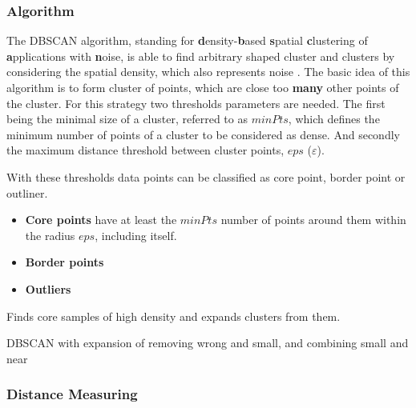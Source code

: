 \documentclass[a4paper,12pt]{report}
\begin{document}
\subsubsection{Algorithm}

The DBSCAN algorithm, standing for \textbf{d}ensity-\textbf{b}ased \textbf{s}patial \textbf{c}lustering of \textbf{a}pplications with \textbf{n}oise, is able to find arbitrary shaped cluster and clusters by considering the spatial density, which also represents noise  \cite{Yildirim2020,Chauhan2020}. The basic idea of this algorithm is to form cluster of points, which are close too \textbf{many} other points of the cluster. For this strategy two thresholds parameters are needed. The first being the minimal size of a cluster, referred to as $minPts$, which defines the minimum number of points of a cluster to be considered as dense. And secondly the maximum distance threshold between cluster points, $eps$ ($\varepsilon$). \cite{Yildirim2020,Chauhan2020} 

With these thresholds data points can be classified as core point, border point or outliner.

\begin{itemize}
	\item \textbf{Core points} have at least the $minPts$ number of points around them within the radius $eps$, including itself.
    \item \textbf{Border points} 
 	\item \textbf{Outliers} 
\end{itemize}

Finds core samples of high density and expands clusters from them.



DBSCAN with expansion of removing wrong and small, and combining small and near


\subsubsection{Distance Measuring}
\end{document}
